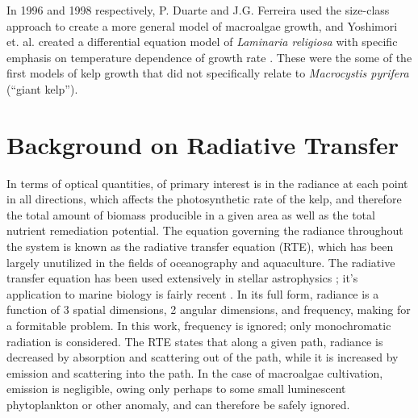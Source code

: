 In 1996 and 1998 respectively, P. Duarte and J.G. Ferreira used the size-class approach to create a more general model of macroalgae growth, and Yoshimori et. al. created a differential equation model of \textit{Laminaria religiosa} with specific emphasis on temperature dependence of growth rate \cite{duarte_model_1997,yoshimori_mathematical_1998}.
These were the some of the first models of kelp growth that did not specifically relate to \textit{Macrocystis pyrifera} (``giant kelp''). 

\section{Background on Radiative Transfer}
In terms of optical quantities, of primary interest is in the radiance at each point in all directions, which affects the photosynthetic rate of the kelp, and therefore the total amount of biomass producible in a given area as well as the total nutrient remediation potential.
The equation governing the radiance throughout the system is known as the radiative transfer equation (RTE), which has been largely unutilized in the fields of oceanography and aquaculture.
The radiative transfer equation has been used extensively in stellar astrophysics \cite{chandrasekhar_radiative_1960,petkova_novel_2011}; it's application to marine biology is fairly recent \cite{mobley_radiative_2001}.
In its full form, radiance is a function of 3 spatial dimensions, 2 angular dimensions, and frequency, making for a formitable problem.
In this work, frequency is ignored; only monochromatic radiation is considered.
The RTE states that along a given path, radiance is decreased by absorption and scattering out of the path, while it is increased by emission and scattering into the path.
In the case of macroalgae cultivation, emission is negligible, owing only perhaps to some small luminescent phytoplankton or other anomaly, and can therefore be safely ignored.

